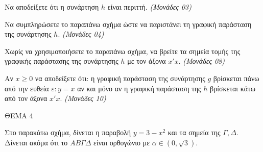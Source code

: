 \documentclass[11pt,a4paper,twoside]{book}
\newcommand{\monades}[1]{\hfill \textit{(Μονάδες #1)}}
\begin{document}
\begin{center}
\end{center}

\begin{alist}
\item Να αποδείξετε ότι η συνάρτηση $h$ είναι περιττή.
\monades{03}

\item Να συμπληρώσετε το παραπάνω σχήμα ώστε να παριστάνει τη γραφική παράσταση της συνάρτησης $h$.
\monades{04}

\item Χωρίς να χρησιμοποιήσετε το παραπάνω σχήμα, να βρείτε τα σημεία τομής της γραφικής παράστασης της συνάρτησης $h$ με τον άξονα $x'x$.
\monades{08}

\item Αν $x \geq 0$ να αποδείξετε ότι: η γραφική παράσταση της συνάρτησης $g$ βρίσκεται πάνω από την ευθεία $\varepsilon: y = x$ αν και μόνο αν η γραφική παράσταση της $h$ βρίσκεται κάτω από τον άξονα $x'x$.
\monades{10}
\end{alist}

\vspace{4mm}

ΘΕΜΑ 4

Στο παρακάτω σχήμα, δίνεται η παραβολή $y = 3 - x^2$ και τα σημεία της $\Gamma, \Delta$. Δίνεται ακόμα ότι το $AB\Gamma\Delta$ είναι ορθογώνιο με $\alpha \in (0, \sqrt{3})$.
\end{document}
